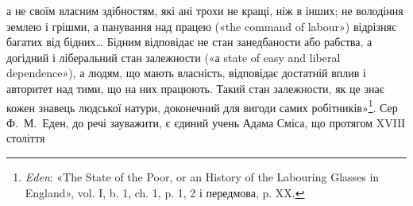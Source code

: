 \parcont{}  %
а не своїм власним здібностям, які ані трохи не кращі, ніж в
інших; не володіння землею і грішми, а панування над працею
(«the command of labour») відрізняє багатих від бідних\dots{} Бідним
відповідає не стан занедбаности або рабства, а догідний і
ліберальний стан залежности («а state of easy and liberal dependence»),
а людям, що мають власність, відповідає достатній вплив
і авторитет над тими, що на них працюють. Такий стан залежности,
як це знає кожен знавець людської натури, доконечний
для вигоди самих робітників»\footnote{
\emph{Eden}: «The State of the Poor, or an History of the Labouring Glasses
in England», vol. I, b. 1, ch. 1, p. 1, 2 і передмова, p. XX.
}. Сер Ф.~М.~Еден, до речі зауважити,
є єдиний учень Адама Сміса, що протягом XVIIІ століття
